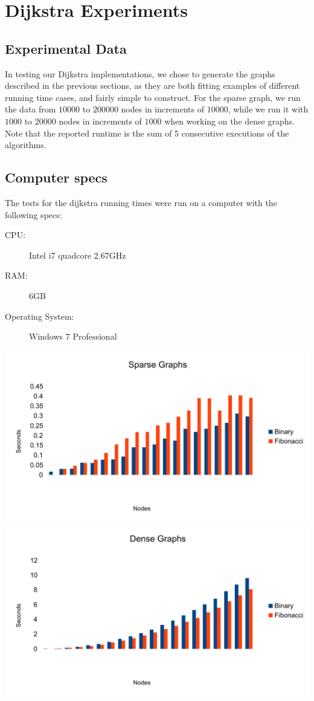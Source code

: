 \section{Dijkstra Experiments}

\subsection{Experimental Data}

In testing our Dijkstra implementations, we chose to generate the graphs described in the previous sections, as they are both fitting examples of different running time cases, and fairly simple to construct.
For the sparse graph, we run the data from $10000$ to $200000$ nodes in increments of $10000$, while we run it with $1000$ to $20000$ nodes in increments of $1000$ when working on the dense graphs.
Note that the reported runtime is the sum of 5 consecutive executions of the algorithms.

\subsection{Computer specs}
The tests for the dijkstra running times were run on a computer with the following specs:

\begin{description}
\item[CPU:] Intel i7 quadcore 2.67GHz
\item[RAM:] 6GB
\item[Operating System:] Windows 7 Professional 
\end{description}


\includegraphics[width=\textwidth]{graphs/sparse}
\includegraphics[width=\textwidth]{graphs/dense}

